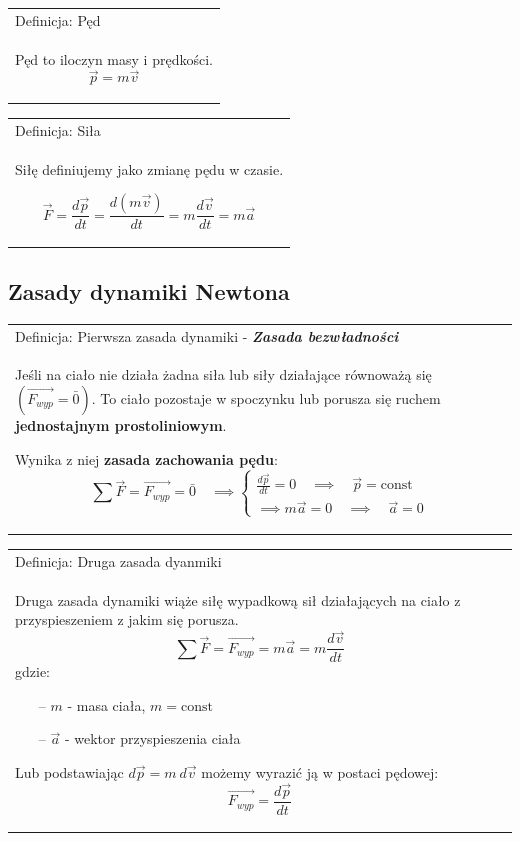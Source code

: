 \documentclass[a4paper]{article}
\newenvironment{definition}[2][Definicja]
    {
        \begin{center}
        \begin{tabular}{|p{1\textwidth}|}
        \hline
            #1: #2\\[2ex]
        \begin{em}
        \Large
    }
    { 
        \end{em}
        \\\hline
        \end{tabular} 
        \end{center}
    }
\begin{document}
    \begin{definition}{Pęd}
        Pęd to iloczyn masy i prędkości. 
        \[\vec{p} = m\vec{v}\]
    \end{definition} 

    \begin{definition}{Siła}
        Siłę definiujemy jako zmianę pędu w czasie.

        \[\vec{F} = \frac{d \vec{p}}{dt} = \frac{d (m \vec{v})}{dt} = m \frac{d\vec{v}}{dt} = m \vec{a}\]
    \end{definition}
    \subsection{\LARGE Zasady dynamiki Newtona}
    \begin{definition}{Pierwsza zasada dynamiki - \textbf{\em{Zasada bezwładności}}}
        Jeśli na ciało nie działa żadna siła lub siły działające równoważą się $\left( \vec{F_{wyp}} = \bar{0} \right)$.
        To ciało pozostaje w spoczynku lub porusza się ruchem \textbf{jednostajnym prostoliniowym}.
        
        Wynika  z niej \textbf{zasada zachowania pędu}:
        \begin{equation*}
            \sum \vec{F} = \vec{F_{wyp}} = \bar{0} \quad \implies
            \begin{cases}
                \frac{d \vec{p}}{dt} = 0 \quad \implies \quad \vec{p} = \text{const}\\
                \implies m\vec{a} = 0 \quad \implies \quad \vec{a} = 0
            \end{cases}
        \end{equation*}

    \end{definition}

    \begin{definition}{Druga zasada dyanmiki}
        Druga zasada dynamiki wiąże siłę wypadkową sił działających na ciało z przyspieszeniem
        z jakim się porusza.
        \[\sum \vec{F} = \vec{F_{wyp}} = m\vec{a} = m\frac{d\vec{v}}{dt}\]
        gdzie:
        \begin{itemize}
            \item[--] $m$ - masa ciała, $m = \text{const}$
            \item[--] $\vec{a}$ - wektor przyspieszenia ciała
        \end{itemize}
        Lub podstawiając $d\vec{p} = m\ d\vec{v}$ możemy wyrazić ją w postaci pędowej:
        \[\vec{F_{wyp}} = \frac{d\vec{p}}{dt}\]
    \end{definition}
\end{document}
